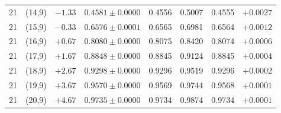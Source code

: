 \documentclass[11pt,a4paper,UTF8]{ctexart}
\begin{document}
{\begin{longtable}{rcrlcccr}
21 & (14,9) & $-1.33$ & $0.4581\pm0.0000$ & 0.4556 & 0.5007 & 0.4555 & $+0.0027$\\
21 & (15,9) & $-0.33$ & $0.6576\pm0.0001$ & 0.6565 & 0.6981 & 0.6564 & $+0.0012$\\
21 & (16,9) & $+0.67$ & $0.8080\pm0.0000$ & 0.8075 & 0.8420 & 0.8074 & $+0.0006$\\
21 & (17,9) & $+1.67$ & $0.8848\pm0.0000$ & 0.8845 & 0.9124 & 0.8845 & $+0.0004$\\
21 & (18,9) & $+2.67$ & $0.9298\pm0.0000$ & 0.9296 & 0.9519 & 0.9296 & $+0.0002$\\
21 & (19,9) & $+3.67$ & $0.9570\pm0.0000$ & 0.9569 & 0.9744 & 0.9568 & $+0.0001$\\
21 & (20,9) & $+4.67$ & $0.9735\pm0.0000$ & 0.9734 & 0.9874 & 0.9734 & $+0.0001$\\
\end{longtable}
}
\end{document}
